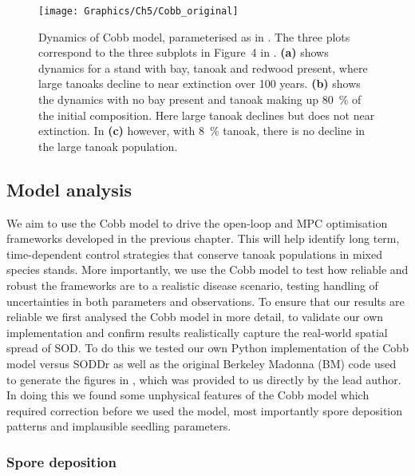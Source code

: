 \begin{figure}[t]
    \begin{center}
        \texttt{[image: Graphics/Ch5/Cobb\_original]}
        \caption[Mixed stand model baseline dynamics]{Dynamics of Cobb model, parameterised as in \citet{cobb_ecosystem_2012}. The three plots correspond to the three subplots in Figure~4 in \citet{cobb_ecosystem_2012}. \textbf{(a)} shows dynamics for a stand with bay, tanoak and redwood present, where large tanoaks decline to near extinction over 100 years. \textbf{(b)} shows the dynamics with no bay present and tanoak making up \SI{80}{\percent} of the initial composition. Here large tanoak declines but does not near extinction. In \textbf{(c)} however, with \SI{8}{\percent} tanoak, there is no decline in the large tanoak population.\label{fig:ch5:cobb_host_change}}
    \end{center}
\end{figure}

\subsection{Model analysis\label{sec:ch5:model_analysis}}

We aim to use the Cobb model to drive the open-loop and MPC optimisation frameworks developed in the previous chapter. This will help identify long term, time-dependent control strategies that conserve tanoak populations in mixed species stands. More importantly, we use the Cobb model to test how reliable and robust the frameworks are to a realistic disease scenario, testing handling of uncertainties in both parameters and observations. To ensure that our results are reliable we first analysed the Cobb model in more detail, to validate our own implementation and confirm results realistically capture the real-world spatial spread of SOD\@. To do this we tested our own Python implementation of the Cobb model versus SODDr as well as the original Berkeley Madonna (BM) code used to generate the figures in \citet{cobb_ecosystem_2012}, which was provided to us directly by the lead author. In doing this we found some unphysical features of the Cobb model which required correction before we used the model, most importantly spore deposition patterns and implausible seedling parameters.

\subsubsection{Spore deposition}

